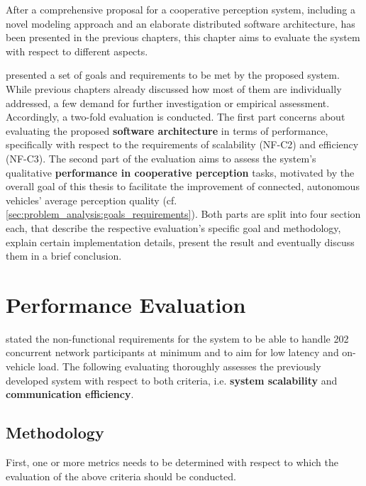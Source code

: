 After a comprehensive proposal for a cooperative perception system, including a novel modeling approach and an elaborate distributed software architecture, has been presented in the previous chapters, this chapter aims to evaluate the system with respect to different aspects.

 presented a set of goals and requirements to be met by the proposed system. While previous chapters already discussed how most of them are individually addressed, a few demand for further investigation or empirical assessment. Accordingly, a two-fold evaluation is conducted. The first part concerns about evaluating the proposed \textbf{software architecture} in terms of performance, specifically with respect to the requirements of scalability (NF-C2) and efficiency (NF-C3). The second part of the evaluation aims to assess the system's qualitative \textbf{performance in cooperative perception} tasks, motivated by the overall goal of this thesis to facilitate the improvement of connected, autonomous vehicles' average perception quality (cf. \cref{sec:problem_analysis:goals_requirements}). Both parts are split into four section each, that describe the respective evaluation's specific goal and methodology, explain certain implementation details, present the result and eventually discuss them in a brief conclusion.

\section{Performance Evaluation}
\label{sec:evaluation:performance_evaluation}
 stated the non-functional requirements for the system to be able to handle 202 concurrent network participants at minimum and to aim for low latency and on-vehicle load. The following evaluating thoroughly assesses the previously developed system with respect to both criteria, i.e. \textbf{system scalability} and \textbf{communication efficiency}.

\subsection{Methodology}
\label{sec:evaluation:performance_evaluation:methodology}
First, one or more metrics needs to be determined with respect to which the evaluation of the above criteria should be conducted.

